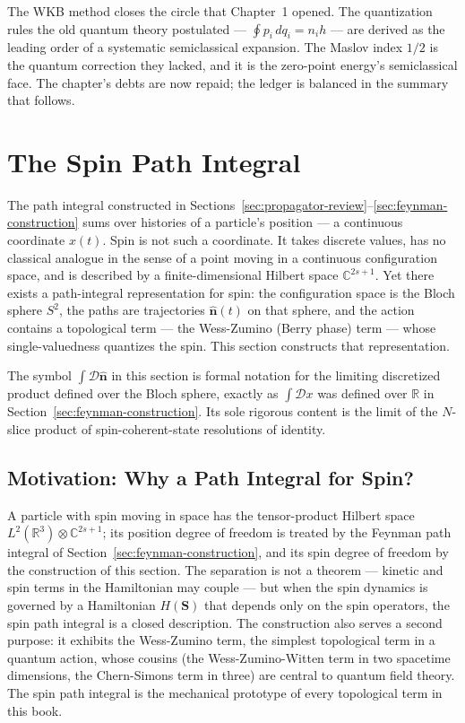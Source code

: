 The WKB method closes the circle that Chapter~1 opened. The quantization rules the old quantum theory postulated --- $\oint p_i\,dq_i = n_i h$ --- are derived as the leading order of a systematic semiclassical expansion. The Maslov index $1/2$ is the quantum correction they lacked, and it is the zero-point energy's semiclassical face. The chapter's debts are now repaid; the ledger is balanced in the summary that follows.


\section{The Spin Path Integral}
\label{sec:spin-path-integral}

The path integral constructed in Sections~\ref{sec:propagator-review}--\ref{sec:feynman-construction} sums over histories of a particle's position --- a continuous coordinate $x(t)$. Spin is not such a coordinate. It takes discrete values, has no classical analogue in the sense of a point moving in a continuous configuration space, and is described by a finite-dimensional Hilbert space $\mathbb{C}^{2s+1}$. Yet there exists a path-integral representation for spin: the configuration space is the Bloch sphere $S^{2}$, the paths are trajectories $\hat{\bm n}(t)$ on that sphere, and the action contains a topological term --- the Wess-Zumino (Berry phase) term --- whose single-valuedness quantizes the spin. This section constructs that representation.

\begin{note}
The symbol $\int\mathcal{D}\hat{\bm n}$ in this section is formal notation for the limiting discretized product defined over the Bloch sphere, exactly as $\int\mathcal{D}x$ was defined over $\mathbb{R}$ in Section~\ref{sec:feynman-construction}. Its sole rigorous content is the limit of the $N$-slice product of spin-coherent-state resolutions of identity.
\end{note}

\subsection{Motivation: Why a Path Integral for Spin?}

A particle with spin moving in space has the tensor-product Hilbert space $L^{2}(\mathbb{R}^{3})\otimes\mathbb{C}^{2s+1}$; its position degree of freedom is treated by the Feynman path integral of Section~\ref{sec:feynman-construction}, and its spin degree of freedom by the construction of this section. The separation is not a theorem --- kinetic and spin terms in the Hamiltonian may couple --- but when the spin dynamics is governed by a Hamiltonian $H(\bm S)$ that depends only on the spin operators, the spin path integral is a closed description. The construction also serves a second purpose: it exhibits the Wess-Zumino term, the simplest topological term in a quantum action, whose cousins (the Wess-Zumino-Witten term in two spacetime dimensions, the Chern-Simons term in three) are central to quantum field theory. The spin path integral is the mechanical prototype of every topological term in this book.

